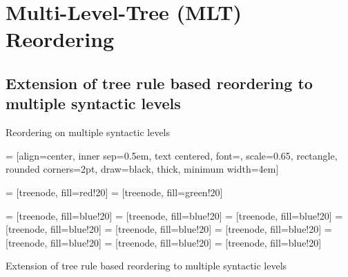 \documentclass[18pt]{beamer}
\begin{document}
\section{Multi-Level-Tree (MLT) Reordering}
\subsection{Extension of tree rule based reordering to multiple syntactic levels}
\begin{frame}{Reordering on multiple syntactic levels}

 = [align=center, inner sep=0.5em, text centered, font=\sffamily, scale=0.65, rectangle, rounded corners=2pt, draw=black, thick, minimum width=4em]

 = [treenode, fill=red!20]
 = [treenode, fill=green!20]

 = [treenode, fill=blue!20]
 = [treenode, fill=blue!20]
 = [treenode, fill=blue!20]
 = [treenode, fill=blue!20]
 = [treenode, fill=blue!20]
 = [treenode, fill=blue!20]
 = [treenode, fill=blue!20]
 = [treenode, fill=blue!20]
 = [treenode, fill=blue!20]

Extension of tree rule based reordering to multiple syntactic levels 
\begin{figure}
\centering

\end{figure}
\end{frame}
\end{document}
